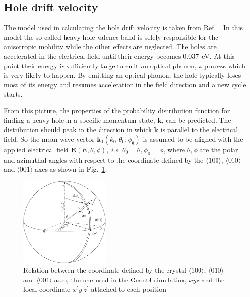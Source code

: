 \subsection{Hole drift velocity}
\label{sec:pss:hole}
The model used in calculating the hole drift velocity is taken from Ref.~\cite{bart}. In this model the so-called heavy hole valence band is solely responsible for the anisotropic mobility while the other effects are neglected. The holes are accelerated in the electrical field until their energy becomes 0.037~eV. At this point their energy is sufficiently large to emit an optical phonon, a process which is very likely to happen. By emitting an optical phonon, the hole typically loses most of its energy and resumes acceleration in the field direction and a new cycle starts. 

From this picture, the properties of the probability distribution function for finding a heavy hole in a specific momentum state, $\mathbf{k}$, can be predicted. The distribution should peak in the direction in which $\mathbf{k}$ is parallel to the electrical field. So the mean wave vector $\mathbf{k}_{0}(k_{0}, \theta_{0}, \phi_{0})$ is assumed to be aligned with the applied electrical field $\mathbf{E}(E, \theta, \phi)$, \textit{i.e.} $\theta_{0} = \theta, \phi_{0} = \phi$, where $\theta, \phi$ are the polar and azimuthal angles with respect to the coordinate defined by the $\langle100\rangle$, $\langle010\rangle$ and $\langle001\rangle$ axes as shown in Fig.~\ref{fig:pss:vsphere}.
\begin{figure}[tbhp]
  \centering
  \includegraphics[width=0.4\textwidth]{vsphere}  
  \caption{Relation between the coordinate defined by the crystal
$\langle100\rangle$, $\langle010\rangle$ and $\langle001\rangle$ axes,
the one used in the Geant4 simulation, $xyz$ and the local coordinate
$x^{\prime}y^{\prime}z^{\prime}$ attached to each position.}
  \label{fig:pss:vsphere}
\end{figure}


